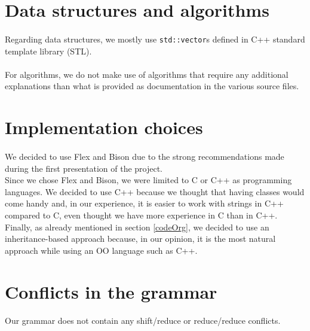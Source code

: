 \documentclass[a4paper, 11pt, oneside]{article}
\begin{document}

\section{Data structures and algorithms}
\paragraph{}Regarding data structures, we mostly use \texttt{std::vector}s defined in C++ standard template library (STL).

\paragraph{}For algorithms, we do not make use of algorithms that require any additional explanations than what is provided as documentation in the various source files.


\section{Implementation choices}
\paragraph{}We decided to use Flex and Bison due to the strong recommendations made during the first presentation of the project.\\
Since we chose Flex and Bison, we were limited to C or C++ as programming languages. We decided to use C++ because we thought that having classes would come handy and, in our experience, it is easier to work with strings in C++ compared to C, even thought we have more experience in C than in C++.
Finally, as already mentioned in section \ref{codeOrg}, we decided to use an inheritance-based approach because, in our opinion, it is the most natural approach while using an OO language such as C++.


\section{Conflicts in the grammar}
\paragraph{}Our grammar does not contain any shift/reduce or reduce/reduce conflicts.
\end{document}
